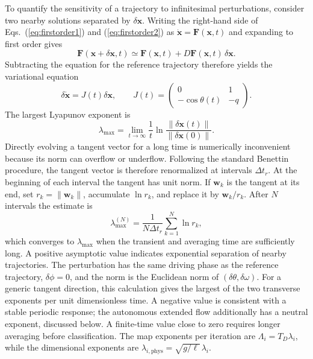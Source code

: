 \documentclass[aps,prb,reprint,floatfix]{revtex4-2}
\newcommand{\vect}[1]{\bm{#1}}
\begin{document}
To quantify the sensitivity of a trajectory to infinitesimal perturbations, consider two nearby solutions separated by $\delta\vect{x}$. Writing the right-hand side of Eqs.~(\ref{eq:firstorder1}) and (\ref{eq:firstorder2}) as $\dot{\vect{x}}=\vect{F}(\vect{x},t)$ and expanding to first order gives
\begin{equation}
 \vect{F}(\vect{x}+\delta\vect{x},t)
 \simeq \vect{F}(\vect{x},t)
 +D\vect{F}(\vect{x},t)\,\delta\vect{x}.
\label{eq:linearization}
\end{equation}
Subtracting the equation for the reference trajectory therefore yields the variational equation
\begin{equation}
 \delta\dot{\vect{x}}=J(t)\delta\vect{x},
\qquad
 J(t)=
 \begin{pmatrix}
 0&1\\
 -\cos\theta(t)&-q
 \end{pmatrix}.
\label{eq:variational}
\end{equation}
The largest Lyapunov exponent is
\begin{equation}
 \lambda_{\max}=\lim_{t\rightarrow\infty}
 \frac{1}{t}\ln\frac{\|\delta\vect{x}(t)\|}
 {\|\delta\vect{x}(0)\|}.
\label{eq:lyapunov_definition}
\end{equation}
Directly evolving a tangent vector for a long time is numerically inconvenient because its norm can overflow or underflow. Following the standard Benettin procedure,\cite{Benettin1980} the tangent vector is therefore renormalized at intervals $\Delta t_r$. At the beginning of each interval the tangent has unit norm. If $\vect w_k$ is the tangent at its end, set $r_k=\|\vect w_k\|$, accumulate $\ln r_k$, and replace it by $\vect w_k/r_k$. After $N$ intervals the estimate is
\begin{equation}
 \lambda_{\max}^{(N)}=
 \frac{1}{N\Delta t_r}\sum_{k=1}^{N}\ln r_k,
\label{eq:benettin}
\end{equation}
which converges to $\lambda_{\max}$ when the transient and averaging time are sufficiently long. A positive asymptotic value indicates exponential separation of nearby trajectories. The perturbation has the same driving phase as the reference trajectory, $\delta\phi=0$, and the norm is the Euclidean norm of $(\delta\theta,\delta\omega)$. For a generic tangent direction, this calculation gives the largest of the two transverse exponents per unit dimensionless time. A negative value is consistent with a stable periodic response; the autonomous extended flow additionally has a neutral exponent, discussed below. A finite-time value close to zero requires longer averaging before classification. The map exponents per iteration are $\Lambda_i=T_D\lambda_i$, while the dimensional exponents are $\lambda_{i,\mathrm{phys}}=\sqrt{g/\ell}\,\lambda_i$.
\end{document}
